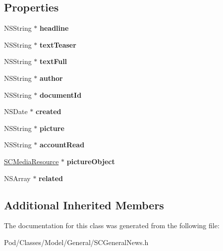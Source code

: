\subsection*{Properties}
\begin{DoxyCompactItemize}
\item 
N\+S\+String $\ast$ {\bfseries headline}\hypertarget{interface_s_c_general_news_aa8a5ba8e8a3fa7a8c527732865b5921f}{}\label{interface_s_c_general_news_aa8a5ba8e8a3fa7a8c527732865b5921f}

\item 
N\+S\+String $\ast$ {\bfseries text\+Teaser}\hypertarget{interface_s_c_general_news_a067316e17943915a4f356fac87f72362}{}\label{interface_s_c_general_news_a067316e17943915a4f356fac87f72362}

\item 
N\+S\+String $\ast$ {\bfseries text\+Full}\hypertarget{interface_s_c_general_news_ab6cf44abf812549dcff3980814a17e07}{}\label{interface_s_c_general_news_ab6cf44abf812549dcff3980814a17e07}

\item 
N\+S\+String $\ast$ {\bfseries author}\hypertarget{interface_s_c_general_news_a70797d2d585a5551ec942d4a1db0f262}{}\label{interface_s_c_general_news_a70797d2d585a5551ec942d4a1db0f262}

\item 
N\+S\+String $\ast$ {\bfseries document\+Id}\hypertarget{interface_s_c_general_news_abb9073cd8bacdabc45bb9ea051f3176a}{}\label{interface_s_c_general_news_abb9073cd8bacdabc45bb9ea051f3176a}

\item 
N\+S\+Date $\ast$ {\bfseries created}\hypertarget{interface_s_c_general_news_aab61d0ed786adbd5ea0210cf5cf212fd}{}\label{interface_s_c_general_news_aab61d0ed786adbd5ea0210cf5cf212fd}

\item 
N\+S\+String $\ast$ {\bfseries picture}\hypertarget{interface_s_c_general_news_a7ba8ca932fcc5e4826e44ef6bbf1a8e1}{}\label{interface_s_c_general_news_a7ba8ca932fcc5e4826e44ef6bbf1a8e1}

\item 
N\+S\+String $\ast$ {\bfseries account\+Read}\hypertarget{interface_s_c_general_news_a56a699a312a9c8c453156ddda3d666dc}{}\label{interface_s_c_general_news_a56a699a312a9c8c453156ddda3d666dc}

\item 
\hyperlink{interface_s_c_media_resource}{S\+C\+Media\+Resource} $\ast$ {\bfseries picture\+Object}\hypertarget{interface_s_c_general_news_af2adabea9e36bb5f31deb60e563d77dd}{}\label{interface_s_c_general_news_af2adabea9e36bb5f31deb60e563d77dd}

\item 
N\+S\+Array $\ast$ {\bfseries related}\hypertarget{interface_s_c_general_news_a42d71e0e965c6a4ecd7f33b60a223b7a}{}\label{interface_s_c_general_news_a42d71e0e965c6a4ecd7f33b60a223b7a}

\end{DoxyCompactItemize}
\subsection*{Additional Inherited Members}


The documentation for this class was generated from the following file\+:\begin{DoxyCompactItemize}
\item 
Pod/\+Classes/\+Model/\+General/S\+C\+General\+News.\+h\end{DoxyCompactItemize}
